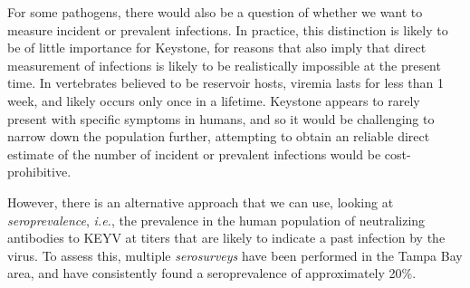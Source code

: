 \documentclass[12pt]{article}
\newcommand{\ie}{\textit{i.e.}}
\newcommand{\cjh}{\textcolor{blue}{cjh}}
\newcommand{\msg}[3]{(#1 $\rightarrow$ #2: #3)}
\newcommand{\mcc}[1]{\msg\cjh\cjh{#1}}
\begin{document}
        For some pathogens, there would also be a question of whether we want to measure incident or prevalent infections. In practice, this distinction is likely to be of little importance for Keystone, for reasons that also imply that direct measurement of infections is likely to be realistically impossible at the present time. In vertebrates believed to be reservoir hosts, viremia lasts for less than 1 week, and likely occurs only once in a lifetime\cite{watts1988maintenance,watts1979experimental}. Keystone appears to rarely present with specific symptoms in humans, and so it would be challenging to narrow down the population further, attempting to obtain an reliable direct estimate of the number of incident or prevalent infections would be cost-prohibitive.
        

        However, there is an alternative approach that we can use, looking at \textit{seroprevalence}, \ie, the prevalence in the human population of neutralizing antibodies to KEYV at titers that are likely to indicate a past infection by the virus. To assess this, multiple \textit{serosurveys} have been performed in the Tampa Bay area, and have consistently found a seroprevalence of approximately 20\%\cite{parkin1972review}.%
\end{document}
